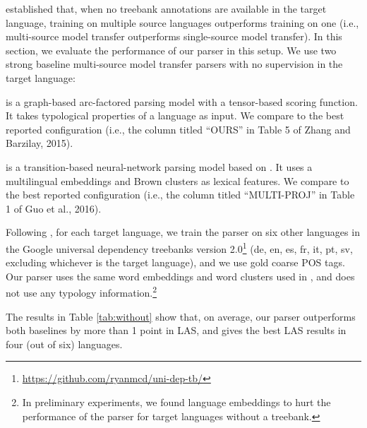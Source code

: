 \documentclass[11pt]{article}
\newenvironment{itemizesquish}{\begin{list}{\labelitemi}{\setlength{\itemsep}{0em}\setlength{\labelwidth}{0.5em}\setlength{\leftmargin}{\labelwidth}\addtolength{\leftmargin}{\labelsep}}}{\end{list}}
\begin{document}
 established that, when no treebank annotations are available in the target language, training on multiple source languages outperforms training on one (i.e., multi-source model transfer outperforms single-source model transfer).
In this section, we evaluate the performance of our parser in this setup.
We use two strong baseline multi-source model transfer parsers with no supervision in the target language:
\begin{itemizesquish}
\item {} is a graph-based arc-factored parsing model with a tensor-based scoring function. It takes typological properties of a language as input.
We compare to the best reported configuration (i.e., the column titled ``OURS'' in Table 5 of Zhang and Barzilay, 2015).
\item {} is a transition-based neural-network parsing model based on . It uses a multilingual embeddings and Brown clusters as lexical features.
We compare to the best reported configuration (i.e., the column titled ``MULTI-PROJ'' in Table 1 of Guo et al., 2016).
\end{itemizesquish}
Following , for each target language, we train the parser on six other languages in the Google universal dependency treebanks version 2.0\footnote{\url{https://github.com/ryanmcd/uni-dep-tb/}} (de, en, es, fr, it, pt, sv, excluding whichever is the target language), and we use gold coarse POS tags.
Our parser uses the same word embeddings and word clusters used in , and does not use any typology information.\footnote{In preliminary experiments, we found language embeddings to hurt the performance of the parser for target languages without a treebank.}

The results in Table \ref{tab:without} show that, on average, our parser outperforms both baselines by more than 1 point in LAS, and gives the best LAS results in four (out of six) languages.
\end{document}
